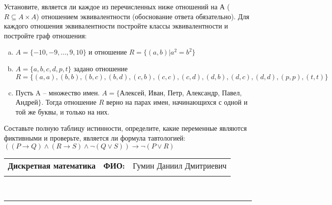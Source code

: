 \documentclass[10pt]{exam}
\newcommand{\class}{Дискретная математика}
\newcommand{\examdate}{}
\begin{document}
\begin{questions}
\question
Установите, является ли каждое из перечисленных ниже отношений на А ($R \subseteq A \times A$) отношением эквивалентности (обоснование ответа обязательно). Для каждого отношения эквивалентности постройте классы 
эквивалентности и постройте граф отношения:
\begin{enumerate} [a)]\setcounter{enumi}{0}
\item $A = \{-10, -9, … , 9, 10\}$ и отношение $R = \{(a,b)|a^{2} = b^{2}\}$
\item $A = \{a, b, c, d, p, t\}$ задано отношение $R = \{(a, a), (b, b), (b, c), (b, d), (c, b), (c, c), (c, d), (d, b), (d, c), (d, d), (p,p), (t,t)\}$
\item Пусть A – множество имен. $A = \{ $Алексей, Иван, Петр, Александр, Павел, Андрей$ \}$. Тогда отношение $R$ верно на парах имен, начинающихся с одной и той же буквы, и только на них.
\end{enumerate}\question Составьте полную таблицу истинности, определите, какие переменные являются фиктивными и проверьте, является ли формула тавтологией:
$((P \rightarrow Q) \land (R \rightarrow S) \land \neg (Q \lor S)) \rightarrow \neg (P \lor R)$

\end{questions}
\newpage
\begin{flushright}
\begin{tabular}{p{2.8in} r l}
\textbf{\class} & \textbf{ФИО:} &Гумин Даниил Дмитриевич
\\

\textbf{\examdate} &&\\
\end{tabular}\\
\end{flushright}
\rule[1ex]{\textwidth}{.1pt}
\end{document}
